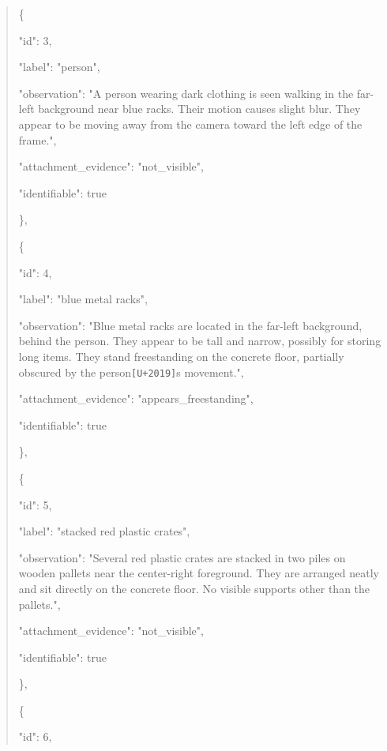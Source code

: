 \documentclass[10pt,a4paper]{article}
\begin{document}
\begin{quote}
    \{\par
      "id":\allowbreak{} 3,\allowbreak{}\par
      "label":\allowbreak{} "person",\allowbreak{}\par
      "observation":\allowbreak{} "A person wearing dark clothing is seen walking in the far-left background near blue racks. Their motion causes slight blur. They appear to be moving away from the camera toward the left edge of the frame.",\allowbreak{}\par
      "attachment\_evidence":\allowbreak{} "not\_visible",\allowbreak{}\par
      "identifiable":\allowbreak{} true\par
    \},\allowbreak{}\par
    \{\par
      "id":\allowbreak{} 4,\allowbreak{}\par
      "label":\allowbreak{} "blue metal racks",\allowbreak{}\par
      "observation":\allowbreak{} "Blue metal racks are located in the far-left background,\allowbreak{} behind the person. They appear to be tall and narrow,\allowbreak{} possibly for storing long items. They stand freestanding on the concrete floor,\allowbreak{} partially obscured by the person\texttt{[U+2019]}s movement.",\allowbreak{}\par
      "attachment\_evidence":\allowbreak{} "appears\_freestanding",\allowbreak{}\par
      "identifiable":\allowbreak{} true\par
    \},\allowbreak{}\par
    \{\par
      "id":\allowbreak{} 5,\allowbreak{}\par
      "label":\allowbreak{} "stacked red plastic crates",\allowbreak{}\par
      "observation":\allowbreak{} "Several red plastic crates are stacked in two piles on wooden pallets near the center-right foreground. They are arranged neatly and sit directly on the concrete floor. No visible supports other than the pallets.",\allowbreak{}\par
      "attachment\_evidence":\allowbreak{} "not\_visible",\allowbreak{}\par
      "identifiable":\allowbreak{} true\par
    \},\allowbreak{}\par
    \{\par
      "id":\allowbreak{} 6,\allowbreak{}\par

\end{quote}
\end{document}
